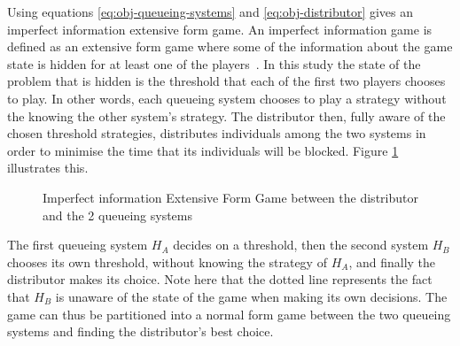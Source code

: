 Using equations \ref{eq:obj-queueing-systems} and \ref{eq:obj-distributor} gives
an imperfect information extensive form game. 
An imperfect information game is defined as an extensive form game where some 
of the information about the game state is hidden for at least one of the 
players~\cite{Berwanger2008}. In this study the state of the problem that is
hidden is the threshold that each of the first two players chooses to play.
In other words, each queueing system chooses to play a strategy without the 
knowing the other system's strategy.
The distributor then, fully aware of the chosen threshold strategies, distributes 
individuals among the two systems in order to minimise the time that its 
individuals will be blocked. Figure \ref{fig:imperfect-info-game} illustrates this. 

\begin{figure}[h]
    \centering
    \caption{Imperfect information Extensive Form Game between the distributor 
    and the 2 queueing systems}
    \label{fig:imperfect-info-game}
\end{figure}

The first 
queueing system \(H_A\) decides on a threshold, then the second system \(H_B\)
chooses its own threshold, without knowing the strategy of \(H_A\), and finally
the distributor makes its choice. Note here that the dotted line represents the
fact that \(H_B\) is unaware of the state of the game when making its own 
decisions. The game can thus be partitioned into a normal form game between the
two queueing systems and finding the distributor's best choice. 

